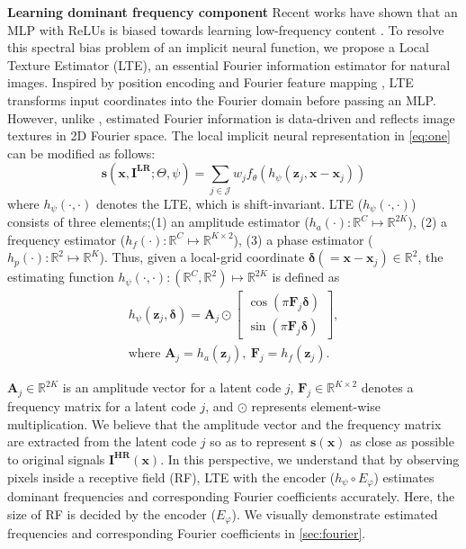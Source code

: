 \documentclass[10pt,twocolumn,letterpaper]{article}
\begin{document}
{\bf Learning dominant frequency component} Recent works have shown that an MLP with ReLUs is biased towards learning low-frequency content \cite{DBLP:conf/icml/RahamanBADLHBC19}. To resolve this spectral bias problem of an implicit neural function, we propose a Local Texture Estimator (LTE), an essential Fourier information estimator for natural images. Inspired by position encoding \cite{mildenhall2020nerf} and Fourier feature mapping \cite{tancik2020fourfeat}, LTE transforms input coordinates into the Fourier domain before passing an MLP. However, unlike \cite{mildenhall2020nerf, tancik2020fourfeat}, estimated Fourier information is data-driven and reflects image textures in 2D Fourier space. The local implicit neural representation in \cref{eq:one} can be modified as follows:
\begin{equation}
    \mathbf s(\mathbf{x},\mathbf{I^{LR}};\Theta,\psi)=\sum_{j\in\mathcal{J}}w_jf_\theta(h_\psi(\mathbf{z}_j,\mathbf{x}-\mathbf{x}_j))
\label{eq:four}
\end{equation}
where $h_\psi(\cdot,\cdot)$ denotes the LTE, which is shift-invariant. LTE ($h_\psi(\cdot,\cdot)$) consists of three elements;(1) an amplitude estimator ($h_a(\cdot):\mathbb{R}^{C}\mapsto \mathbb{R}^{2K}$), (2) a frequency estimator ($h_f(\cdot):\mathbb{R}^{C}\mapsto \mathbb{R}^{K\times2}$), (3) a phase estimator ($h_p(\cdot):\mathbb{R}^{2}\mapsto \mathbb{R}^{K}$). Thus, given a local-grid coordinate $\boldsymbol{\delta}(=\mathbf{x}-\mathbf{x}_j)\in\mathbb{R}^2$, the estimating function $h_\psi(\cdot,\cdot):(\mathbb{R}^C,\mathbb{R}^2)\mapsto \mathbb{R}^{2K}$ is defined as
\begin{gather}
h_\psi(\mathbf{z}_j,\boldsymbol{\delta})=
\mathbf{A}_j\odot\begin{bmatrix}
\cos(\pi \mathbf F_{j}\boldsymbol{\delta})\\
\sin(\pi \mathbf F_{j}\boldsymbol{\delta})
\end{bmatrix},\label{eq:five}\\
\mbox{where }\mathbf{A}_j=h_a(\mathbf z_j),~
\mathbf{F}_j=h_f(\mathbf z_j).
\end{gather}

$\mathbf{A}_j\in\mathbb{R}^{2K}$ is an amplitude vector for a latent code $j$, $\mathbf{F}_j\in\mathbb{R}^{K\times 2}$ denotes a frequency matrix for a latent code $j$, and $\odot$ represents element-wise multiplication. We believe that the amplitude vector and the frequency matrix are extracted from the latent code $j$ so as to represent $\mathbf s(\mathbf x)$ as close as possible to original signals $\mathbf I^{\mathbf{HR}}(\mathbf x)$. In this perspective, we understand that by observing pixels inside a receptive field (RF), LTE with the encoder ($h_\psi \circ E_\varphi$) estimates dominant frequencies and corresponding Fourier coefficients accurately. Here, the size of RF is decided by the encoder ($E_\varphi$). We visually demonstrate estimated frequencies and corresponding Fourier coefficients in \cref{sec:fourier}.
\end{document}
